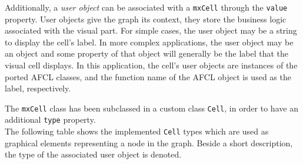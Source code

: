 \documentclass[a4paper,top=25mm,bottom=25mm,12pt,pdftex,halfparskip,twoside,bibtotoc,numbers=noenddot]{scrbook}
\begin{document}
Additionally, a \textit{user object} can be associated with a \texttt{mxCell} through the \texttt{value} property. User objects give the graph its context, they store the business logic associated with the visual part. \cite{manuals-mxgraph-user-manual} For simple cases, the user object may be a string to display the cell's label. In more complex applications, the user object may be an object and some property of that object will generally be the label that the visual cell displays. In this application, the cell's user objects are instances of the ported AFCL classes, and the function name of the AFCL object is used as the label, respectively.

The \texttt{mxCell} class has been subclassed in a custom class \texttt{Cell}, in order to have an additional \texttt{type} property.\\

The following table shows the implemented \texttt{Cell} types which are used as graphical elements representing a node in the graph. Beside a short description, the type of the associated user object is denoted.
\end{document}
